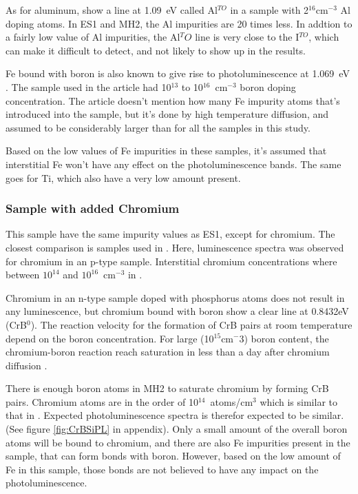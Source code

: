 As for aluminum, \cite{dean67} show a line at 1.09~eV called Al$^{TO}$ in a sample with 2$^{16}$cm$^{-3}$ Al doping atoms. In ES1 and MH2, the Al impurities are 20 times less. In addtion to a fairly low value of Al impurities, the Al$^TO$ line is very close to the I$^{TO}$, which can make it difficult to detect, and not likely to show up in the results.

Fe bound with boron is also known to give rise to photoluminescence at 1.069~eV \cite{mohring83}. The sample used in the article had  10$^{13}$ to 10$^{16}$~cm$^{-3}$ boron doping concentration. The article doesn't mention how many Fe impurity atoms that's introduced into the sample, but it's done by high temperature diffusion, and assumed to be considerably larger than for all the samples in this study. 

Based on the low values of Fe impurities in these samples, it's assumed that interstitial Fe won't have any effect on the photoluminescence bands. The same goes for Ti, which also have a very low amount present.


\subsubsection{Sample with added Chromium}

This sample have the same impurity values as ES1, except for chromium. The closest comparison is samples used in \cite{conzelmann82}. Here, luminescence spectra was observed for chromium in an p-type sample. Interstitial chromium concentrations where between $10^{14}$ and $10^{16} $~cm$^{-3}$ in \cite{conzelmann82}.

Chromium in an n-type sample doped with phosphorus atoms does not result in any luminescence, but chromium bound with boron show a clear line at 0.8432eV (CrB$^0$). The reaction velocity for the formation of CrB pairs at room temperature depend on the boron concentration. For large (10$^15$cm$^-3$) boron content, the chromium-boron reaction reach saturation in less than a day after chromium diffusion \cite{conzelmann82}.

There is enough boron atoms in MH2 to saturate chromium by forming CrB pairs. Chromium atoms are in the order of 10$^{14}$~atoms/cm$^3$ which is similar to that in \cite{conzelmann82}. Expected photoluminescence spectra is therefor expected to be similar. (See figure \ref{fig:CrBSiPL} in appendix). Only a small amount of the overall boron atoms will be bound to chromium, and there are also Fe impurities present in the sample, that can form bonds with boron. However, based on the low amount of Fe in this sample, those bonds are not believed to have any impact on the photoluminescence.

